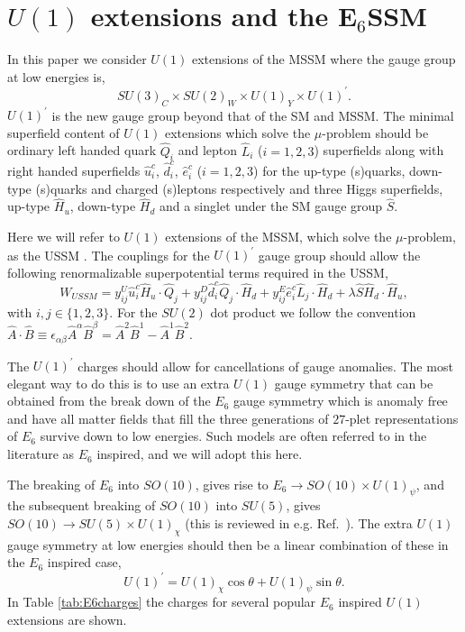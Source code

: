 \documentclass[preprint,amsmath,amssymb,aps,superscriptaddress,prd,
showpacs,floatfix,nofootinbib]{revtex4-1}
\newcommand{\be}{\begin{equation}}
\newcommand{\ee}{\end{equation}}
\begin{document}
\section{\label{sec:model}$U(1)$ extensions and the
E$_6$SSM}

In this paper we consider $U(1)$ extensions of the MSSM where the gauge
group at low energies is, \be SU(3)_C\times SU(2)_W\times U(1)_Y\times
U(1)^\prime.  \ee $U(1)^\prime$ is the new gauge group beyond
that of the SM and MSSM.  The minimal superfield content of $U(1)$
extensions which solve the $\mu$-problem should be ordinary left
handed quark $\hat{Q}_i$ and lepton $\hat{L}_i$
($i=1,2,3$) superfields along with right handed superfields
$\hat{u}^c_i$, $\hat{d}^c_i$, $\hat{e}^c_i$ ($i=1,2,3$) for the
up-type (s)quarks, down-type (s)quarks and charged (s)leptons
respectively and three Higgs superfields, up-type $\hat{H}_u$,
down-type $\hat{H}_d$ and a singlet under the SM gauge group
$\hat{S}$.

Here we will refer to $U(1)$ extensions of the MSSM, which solve the
$\mu$-problem, as the USSM \cite{Cvetic:1995rj, Jain:1995cb,
  Nir:1995bu, Cvetic:1996mf, Cvetic:1997ky}.  The couplings for the
$U(1)^\prime$ gauge group should allow the following renormalizable
superpotential terms required in the USSM,
\begin{equation}
 W_{USSM} = y^U_{ij} \hat{u}^c_i \hat{H}_u \cdot \hat{Q}_j + y^D_{ij}
\hat{d}^c_i \hat{Q}_j \cdot \hat{H}_d + y^E_{ij} \hat{e}^c_i \hat{L}_j
\cdot \hat{H}_d + \lambda \hat{S} \hat{H}_d \cdot \hat{H}_u ,
\end{equation}
with $i,j \in \{1,2,3\}$.  For the $SU(2)$ dot product we follow the
convention $\hat{A} \cdot \hat{B} \equiv \epsilon_{\alpha \beta}
\hat{A}^\alpha \hat{B}^\beta = \hat{A}^2 \hat{B}^1 - \hat{A}^1 \hat{B}^2$.

The $U(1)^\prime$ charges should allow for cancellations of gauge
anomalies.  The most elegant way to do this is to use an extra $U(1)$
gauge symmetry that can be obtained from the break down of the $E_6$
gauge symmetry which is anomaly free and have all matter fields that fill the
three generations of $27$-plet representations of $E_6$ survive down to
low energies.  Such models are often referred to in the literature as
$E_6$ inspired, and we will adopt this here.

The breaking of $E_6$ into $SO(10)$, gives rise to $E_6 \to
SO(10) \times U(1)_{\psi}$, and the subsequent breaking of $SO(10)$
into $SU(5)$, gives $SO(10) \to SU(5) \times U(1)_{\chi}$ (this is
reviewed in e.g. Ref.~\cite{Langacker:2008yv}).  The extra $U(1)$ gauge
symmetry at low energies should then be a linear combination of these
in the $E_6$ inspired case, \be U(1)^\prime = U(1)_{\chi} \cos\theta
+ U(1)_{\psi} \sin\theta .  \ee In Table \ref{tab:E6charges} the
charges for several popular $E_6$ inspired $U(1)$ extensions are
shown.
\end{document}

